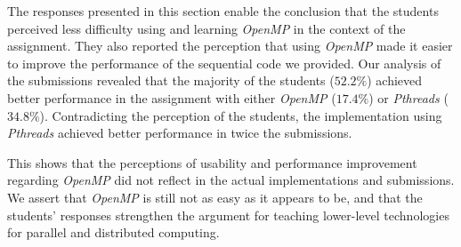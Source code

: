 
The responses presented in this section enable the conclusion that the students
perceived less difficulty using and learning \textit{OpenMP} in the context
of the assignment. They also reported the perception that using \textit{OpenMP}
made it easier to improve the performance of the sequential code we provided.
Our analysis of the submissions revealed that the majority of the students
($52.2\%$) achieved better performance in the assignment with either
\textit{OpenMP} ($17.4\%$) or \textit{Pthreads} ($34.8\%$). Contradicting the
perception of the students, the implementation using \textit{Pthreads} achieved
better performance in twice the submissions.

This shows that the perceptions of usability and performance improvement
regarding \textit{OpenMP} did not reflect in the actual implementations and
submissions. We assert that \textit{OpenMP} is still not as easy as it appears
to be, and that the students' responses strengthen the argument for teaching
lower-level technologies for parallel and distributed computing.
